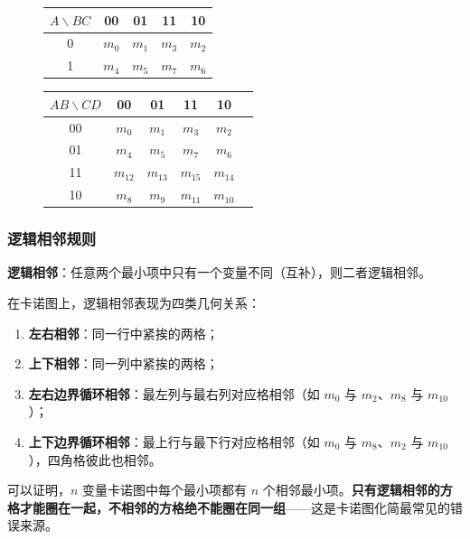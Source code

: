 \begin{figure}[!htbp]
\centering
\begin{minipage}{0.44\textwidth}
    \centering
    \begin{tabular}{|c|c|c|c|c|}
        \hline
        $A\backslash BC$ & 00 & 01 & 11 & 10 \\
        \hline
        0 & $m_0$ & $m_1$ & $m_3$ & $m_2$ \\
        \hline
        1 & $m_4$ & $m_5$ & $m_7$ & $m_6$ \\
        \hline
    \end{tabular}
\end{minipage}
\hfill
\begin{minipage}{0.5\textwidth}
    \centering
    \begin{tabular}{|c|c|c|c|c|c|}
        \hline
        $AB\backslash CD$ & 00 & 01 & 11 & 10 \\
        \hline
        00 & $m_0$ & $m_1$ & $m_3$ & $m_2$ \\
        \hline
        01 & $m_4$ & $m_5$ & $m_7$ & $m_6$ \\
        \hline
        11 & $m_{12}$ & $m_{13}$ & $m_{15}$ & $m_{14}$ \\
        \hline
        10 & $m_8$ & $m_9$ & $m_{11}$ & $m_{10}$ \\
        \hline
    \end{tabular}
\end{minipage}
\end{figure}

\subsubsection{逻辑相邻规则}
\textbf{逻辑相邻}：任意两个最小项中只有一个变量不同（互补），则二者逻辑相邻。

在卡诺图上，逻辑相邻表现为四类几何关系：
\begin{enumerate}
    \item \textbf{左右相邻}：同一行中紧挨的两格；
    \item \textbf{上下相邻}：同一列中紧挨的两格；
    \item \textbf{左右边界循环相邻}：最左列与最右列对应格相邻（如 $m_0$ 与 $m_2$、$m_8$ 与 $m_{10}$）；
    \item \textbf{上下边界循环相邻}：最上行与最下行对应格相邻（如 $m_0$ 与 $m_8$、$m_2$ 与 $m_{10}$），四角格彼此也相邻。
\end{enumerate}
可以证明，$n$ 变量卡诺图中每个最小项都有 $n$ 个相邻最小项。\textbf{只有逻辑相邻的方格才能圈在一起，不相邻的方格绝不能圈在同一组}——这是卡诺图化简最常见的错误来源。

